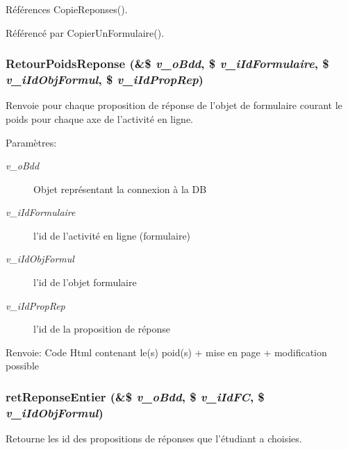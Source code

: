 Références CopieReponses().

Référencé par CopierUnFormulaire().
\subsubsection{\setlength{\rightskip}{0pt plus 5cm}RetourPoidsReponse (\&\$ {\em v\_\-oBdd}, \/  \$ {\em v\_\-iIdFormulaire}, \/  \$ {\em v\_\-iIdObjFormul}, \/  \$ {\em v\_\-iIdPropRep})}\label{fonctions__form_8inc_8php_d5c1c0a4e46479088cf8c2d57311cd1e}


Renvoie pour chaque proposition de réponse de l'objet de formulaire courant le poids pour chaque axe de l'activité en ligne. 

\begin{Desc}
\item[Paramètres:]
\begin{description}
\item[{\em v\_\-oBdd}]Objet représentant la connexion à la DB \item[{\em v\_\-iIdFormulaire}]l'id de l'activité en ligne (formulaire) \item[{\em v\_\-iIdObjFormul}]l'id de l'objet formulaire \item[{\em v\_\-iIdPropRep}]l'id de la proposition de réponse\end{description}
\end{Desc}
\begin{Desc}
\item[Renvoie:]Code Html contenant le(s) poid(s) + mise en page + modification possible \end{Desc}
\subsubsection{\setlength{\rightskip}{0pt plus 5cm}retReponseEntier (\&\$ {\em v\_\-oBdd}, \/  \$ {\em v\_\-iIdFC}, \/  \$ {\em v\_\-iIdObjFormul})}\label{fonctions__form_8inc_8php_13805948594d68a0b5199395ff18e4ad}


Retourne les id des propositions de réponses que l'étudiant a choisies. 

